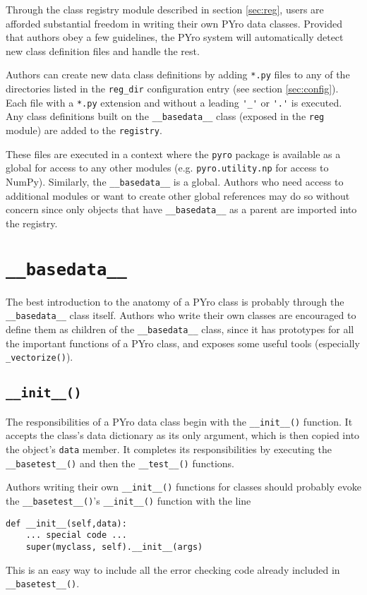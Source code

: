 Through the class registry module described in section \ref{sec:reg}, users are afforded substantial freedom in writing their own PYro data classes.  Provided that authors obey a few guidelines, the PYro system will automatically detect new class definition files and handle the rest.

Authors can create new data class definitions by adding \verb|*.py| files to any of the directories listed in the \verb|reg_dir| configuration entry (see section \ref{sec:config}).  Each file with a \verb|*.py| extension and without a leading \verb|'_'| or \verb|'.'| is executed.  Any class definitions built on the \verb|__basedata__| class (exposed in the \verb|reg| module) are added to the \verb|registry|.

These files are executed in a context where the \verb|pyro| package is available as a global for access to any other modules (e.g. \verb|pyro.utility.np| for access to NumPy).  Similarly, the \verb|__basedata__| is a global.  Authors who need access to additional modules or want to create other global references may do so without concern since only objects that have \verb|__basedata__| as a parent are imported into the registry.

\section{\texttt{\_\_basedata\_\_}}
The best introduction to the anatomy of a PYro class is probably through the \verb|__basedata__| class itself.  Authors who write their own classes are encouraged to define them as children of the \verb|__basedata__| class, since it has prototypes for all the important functions of a PYro class, and exposes some useful tools (especially \verb|_vectorize()|).

\subsection{\texttt{\_\_init\_\_()}}
The responsibilities of a PYro data class begin with the \verb|__init__()| function.  It accepts the class's data dictionary as its only argument, which is then copied into the object's \verb|data| member.  It completes its responsibilities by executing the \verb|__basetest__()| and then the \verb|__test__()| functions.

Authors writing their own \verb|__init__()| functions for classes should probably evoke the \verb|__basetest__()|'s \verb|__init__()| function with the line
\begin{verbatim}
def __init__(self,data):
    ... special code ...
    super(myclass, self).__init__(args)
\end{verbatim}
This is an easy way to include all the error checking code already included in \verb|__basetest__()|.

